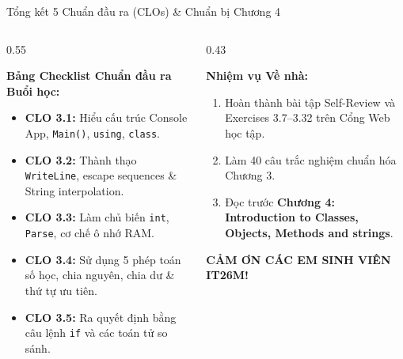 \documentclass[aspectratio=169, 10pt]{beamer}
\begin{document}
\begin{frame}{Tổng kết 5 Chuẩn đầu ra (CLOs) \& Chuẩn bị Chương 4}
  \begin{columns}[T]
    \begin{column}{0.55\textwidth}
      \begin{block}{\textbf{Bảng Checklist Chuẩn đầu ra Buổi học:}}
        \begin{itemize}\small
          \item[$\checkmark$] \textbf{CLO 3.1:} Hiểu cấu trúc Console App, \texttt{Main()}, \texttt{using}, \texttt{class}.
          \item[$\checkmark$] \textbf{CLO 3.2:} Thành thạo \texttt{WriteLine}, escape sequences \& String interpolation.
          \item[$\checkmark$] \textbf{CLO 3.3:} Làm chủ biến \texttt{int}, \texttt{Parse}, cơ chế ô nhớ RAM.
          \item[$\checkmark$] \textbf{CLO 3.4:} Sử dụng 5 phép toán số học, chia nguyên, chia dư \& thứ tự ưu tiên.
          \item[$\checkmark$] \textbf{CLO 3.5:} Ra quyết định bằng câu lệnh \texttt{if} và các toán tử so sánh.
        \end{itemize}
      \end{block}
    \end{column}

    \begin{column}{0.43\textwidth}
      \begin{exampleblock}{\textbf{Nhiệm vụ Về nhà:}}
        \begin{enumerate}\small
          \item Hoàn thành bài tập Self-Review và Exercises 3.7--3.32 trên Cổng Web học tập.
          \item Làm 40 câu trắc nghiệm chuẩn hóa Chương 3.
          \item Đọc trước \textbf{Chương 4: Introduction to Classes, Objects, Methods and strings}.
        \end{enumerate}
      \end{exampleblock}
      \begin{center}
        \textbf{\large CẢM ƠN CÁC EM SINH VIÊN IT26M!}
      \end{center}
    \end{column}
  \end{columns}
\end{frame}
\end{document}
